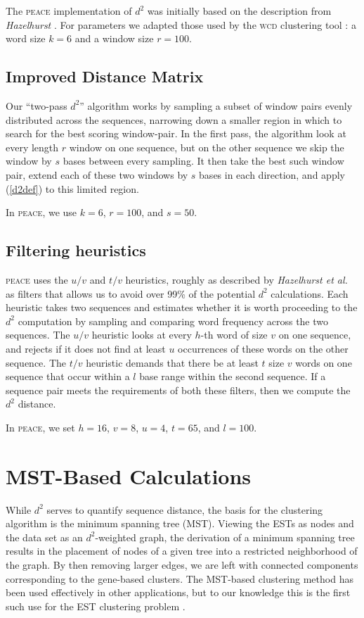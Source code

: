 \documentclass[a4paper,12pt]{article}
\begin{document}
\begin{appendix}
The \textsc{peace} implementation of $d^2$ was initially based on the description from
{\it Hazelhurst} \cite{Hazelhurst04}.  For parameters
we adapted those used by the \textsc{wcd} clustering tool \cite{Hazelhurst08a}:
a word size $k=6$ and a window size $r=100$.

\subsection{Improved Distance Matrix}
Our ``two-pass $d^2$'' algorithm works by sampling a subset of window
pairs evenly distributed across the sequences, narrowing down a
smaller region in which to search for the best scoring window-pair.
In the first pass, the algorithm look at every length $r$ window on one sequence,
but on the other sequence we skip the window by $s$ bases between
every sampling.  It then take the best such window pair, extend
each of these two windows by $s$ bases in each direction, and apply
(\ref{d2def}) to this limited region.

In \textsc{peace}, we use $k=6$, $r=100$, and $s=50$.

\subsection{Filtering heuristics}
\textsc{peace} uses the $u/v$ and $t/v$ heuristics, roughly as described by {\it
  Hazelhurst et al.} \cite{Hazelhurst08a} as filters that allows us to avoid
over 99\% of the potential $d^2$ calculations.  Each heuristic takes two
sequences and estimates whether it is worth proceeding to the $d^2$
computation by sampling and comparing word frequency across the two
sequences.  The $u/v$ heuristic looks at every $h$-th word of size $v$
on one sequence, and rejects if it does not find at least $u$ occurrences
of these words on the other sequence.  The $t/v$ heuristic demands
that there be at least $t$ size $v$ words on one sequence that occur
within a $l$ base range within the second sequence.  If a sequence
pair meets the requirements of both these filters, then we compute the
$d^2$ distance.

In \textsc{peace}, we set $h=16$, $v=8$, $u=4$, $t=65$, and $l=100$.

\section{MST-Based  Calculations}

While $d^2$ serves to quantify sequence distance, the basis for the
clustering algorithm is the minimum spanning tree (MST).  Viewing the
ESTs as nodes and the data set as an $d^2$-weighted graph, the
derivation of a minimum spanning tree results in the placement of
nodes of a given tree into a restricted neighborhood of the graph.  By
then removing larger edges, we are left with connected components
corresponding to the gene-based clusters.  The MST-based clustering
method has been used effectively in other applications, but to our
knowledge this is the first such use for the  EST
clustering problem \cite{Jain99,Wan08}.


\end{appendix}
\end{document}
